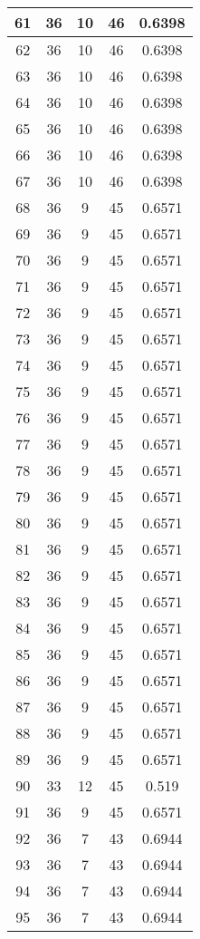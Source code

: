 \documentclass[letterpaper, 12pt]{article}
\begin{document}
\begin{longtable}{|c|c|c|c|c|}
\hline
61 & 36 & 10 & 46 & 0.6398 \\
\hline
62 & 36 & 10 & 46 & 0.6398 \\
\hline
63 & 36 & 10 & 46 & 0.6398 \\
\hline
64 & 36 & 10 & 46 & 0.6398 \\
\hline
65 & 36 & 10 & 46 & 0.6398 \\
\hline
66 & 36 & 10 & 46 & 0.6398 \\
\hline
67 & 36 & 10 & 46 & 0.6398 \\
\hline
68 & 36 & 9 & 45 & 0.6571 \\
\hline
69 & 36 & 9 & 45 & 0.6571 \\
\hline
70 & 36 & 9 & 45 & 0.6571 \\
\hline
71 & 36 & 9 & 45 & 0.6571 \\
\hline
72 & 36 & 9 & 45 & 0.6571 \\
\hline
73 & 36 & 9 & 45 & 0.6571 \\
\hline
74 & 36 & 9 & 45 & 0.6571 \\
\hline
75 & 36 & 9 & 45 & 0.6571 \\
\hline
76 & 36 & 9 & 45 & 0.6571 \\
\hline
77 & 36 & 9 & 45 & 0.6571 \\
\hline
78 & 36 & 9 & 45 & 0.6571 \\
\hline
79 & 36 & 9 & 45 & 0.6571 \\
\hline
80 & 36 & 9 & 45 & 0.6571 \\
\hline
81 & 36 & 9 & 45 & 0.6571 \\
\hline
82 & 36 & 9 & 45 & 0.6571 \\
\hline
83 & 36 & 9 & 45 & 0.6571 \\
\hline
84 & 36 & 9 & 45 & 0.6571 \\
\hline
85 & 36 & 9 & 45 & 0.6571 \\
\hline
86 & 36 & 9 & 45 & 0.6571 \\
\hline
87 & 36 & 9 & 45 & 0.6571 \\
\hline
88 & 36 & 9 & 45 & 0.6571 \\
\hline
89 & 36 & 9 & 45 & 0.6571 \\
\hline
90 & 33 & 12 & 45 & 0.519 \\
\hline
91 & 36 & 9 & 45 & 0.6571 \\
\hline
92 & 36 & 7 & 43 & 0.6944 \\
\hline
93 & 36 & 7 & 43 & 0.6944 \\
\hline
94 & 36 & 7 & 43 & 0.6944 \\
\hline
95 & 36 & 7 & 43 & 0.6944 \\

\end{longtable}
\end{document}

